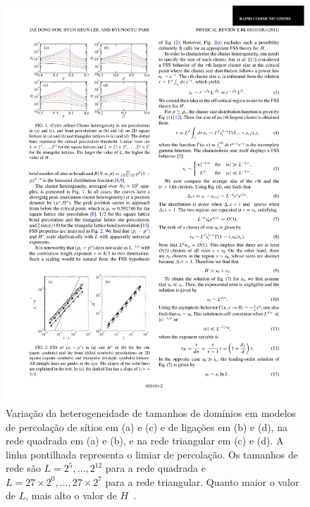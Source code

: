 \begin{figure}
 \centering
 \includegraphics[width=14cm]{img/HetPerc.pdf}
 \caption{Variação da heterogeneidade de tamanhos de domínios em modelos de percolação de sítios em (a) e (c) e de ligações em (b) e (d), na rede quadrada em (a) e (b), e na rede triangular em (c) e (d). A linha pontilhada representa o limiar de percolação. Os tamanhos de rede são $L=2^5, \ldots, 2^{12}$ para a rede quadrada e $L=27 \times 2^0, \ldots, 27 \times 2^7$ para a rede triangular. Quanto maior o valor de $L$, mais alto o valor de $H$~\cite{NohLeePark}.}
\label{fig.HetPerc}
\vspace{8mm}

\end{figure}
